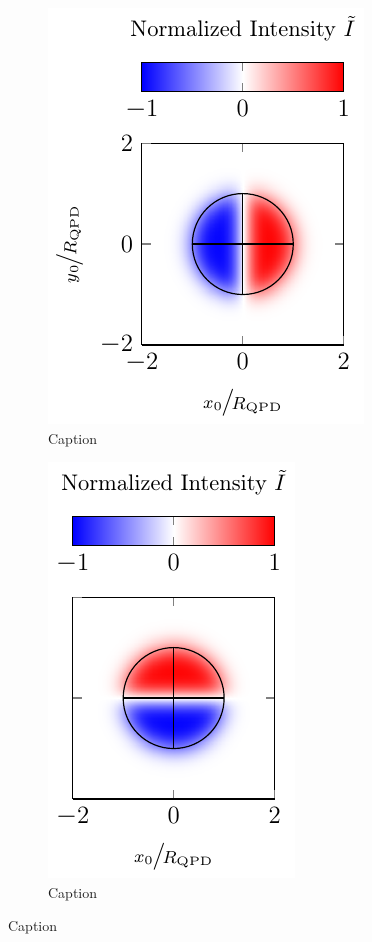 \begin{figure}
  \centering
  \begin{subfigure}[b]{0.35\textwidth}
    \centering
    \includegraphics[]{Plots/cache/QPDx.pdf}
    \caption{Caption}
    \label{fig:Th-QPDx}
  \end{subfigure}
  \hfill
  \begin{subfigure}[b]{0.3\textwidth}
    \centering
    \includegraphics[]{Plots/cache/QPDy.pdf}
    \caption{Caption}

\end{subfigure}
\end{figure}
